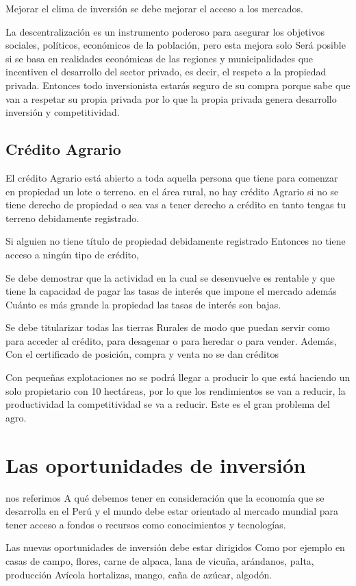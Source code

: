 \documentclass[
  letterpaper,
  DIV=11,
  numbers=noendperiod]{scrartcl}
\begin{document}
Mejorar el clima de inversión se debe mejorar el acceso a los mercados.

La descentralización es un instrumento poderoso para asegurar los
objetivos sociales, políticos, económicos de la población, pero esta
mejora solo Será posible si se basa en realidades económicas de las
regiones y municipalidades que incentiven el desarrollo del sector
privado, es decir, el respeto a la propiedad privada. Entonces todo
inversionista estarás seguro de su compra porque sabe que van a respetar
su propia privada por lo que la propia privada genera desarrollo
inversión y competitividad.

\hypertarget{cruxe9dito-agrario}{%
\subsection{Crédito Agrario}\label{cruxe9dito-agrario}}

El crédito Agrario está abierto a toda aquella persona que tiene para
comenzar en propiedad un lote o terreno. en el área rural, no hay
crédito Agrario si no se tiene derecho de propiedad o sea vas a tener
derecho a crédito en tanto tengas tu terreno debidamente registrado.

Si alguien no tiene título de propiedad debidamente registrado Entonces
no tiene acceso a ningún tipo de crédito,

Se debe demostrar que la actividad en la cual se desenvuelve es rentable
y que tiene la capacidad de pagar las tasas de interés que impone el
mercado además Cuánto es más grande la propiedad las tasas de interés
son bajas.

Se debe titularizar todas las tierras Rurales de modo que puedan servir
como para acceder al crédito, para desagenar o para heredar o para
vender. Además, Con el certificado de posición, compra y venta no se dan
créditos

Con pequeñas explotaciones no se podrá llegar a producir lo que está
haciendo un solo propietario con 10 hectáreas, por lo que los
rendimientos se van a reducir, la productividad la competitividad se va
a reducir. Este es el gran problema del agro.

\hypertarget{las-oportunidades-de-inversiuxf3n}{%
\section{Las oportunidades de
inversión}\label{las-oportunidades-de-inversiuxf3n}}

nos referimos A qué debemos tener en consideración que la economía que
se desarrolla en el Perú y el mundo debe estar orientado al mercado
mundial para tener acceso a fondos o recursos como conocimientos y
tecnologías.

Las nuevas oportunidades de inversión debe estar dirigidos Como por
ejemplo en casas de campo, flores, carne de alpaca, lana de vicuña,
arándanos, palta, producción Avícola hortalizas, mango, caña de azúcar,
algodón.


\printbibliography
\end{document}
